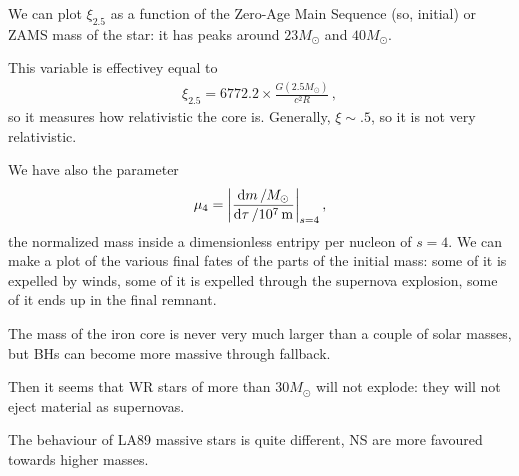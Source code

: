 \documentclass[main.tex]{subfiles}
\begin{document}
We can plot \(\xi_{2.5}\) as a function of the Zero-Age Main Sequence (so, initial) or ZAMS mass of the star: it has peaks around \(23 M_{\odot}\) and \(40 M_{\odot}\).

\begin{bluebox}
This variable is effectivey equal to 
%
\begin{align}
\xi_{2.5} = 6772.2 \times \frac{G (2.5 M_{\odot})}{c^2 R}
\,,
\end{align}
%
so it measures how relativistic the core is. Generally, \(\xi \sim \num{.5}\), so it is not very relativistic.
\end{bluebox}

We have also the parameter 
%
\begin{align}
  \mu_{4}  = \abs{\frac{ \dd{m} / M_{\odot}}{ \dd{\tau } / \SI{e7}{m}}}_{s=4}
\,,
\end{align}
%
the normalized mass inside a dimensionless entripy per nucleon of \(s=4\). 
We can make a plot of the various final fates of the parts of the initial mass: some of it is expelled by winds, some of it is expelled through the supernova explosion, some of it ends up in the final remnant.

The mass of the iron core is never very much larger than a couple of solar masses, but BHs can become more massive through fallback. 

Then it seems that WR stars of more than \(30 M_{\odot}\) will not explode: they will not eject material as supernovas. 


The behaviour of LA89 massive stars is quite different, NS are more favoured towards higher masses. 
\end{document}
